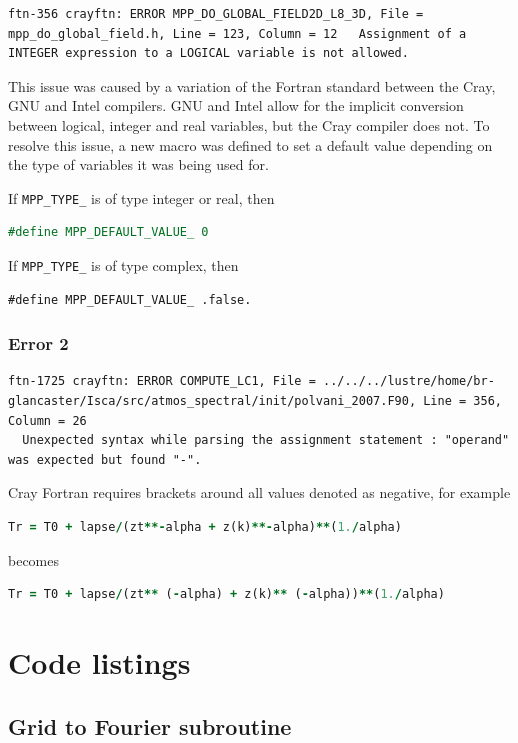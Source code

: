 \documentclass[a4paper,11pt]{report}
\newcommand{\toclesssection}[1]{\section{#1}\addtocounter{section}{1}}
\begin{document}
\begin{lstlisting}
ftn-356 crayftn: ERROR MPP_DO_GLOBAL_FIELD2D_L8_3D, File = mpp_do_global_field.h, Line = 123, Column = 12   Assignment of a INTEGER expression to a LOGICAL variable is not allowed.
\end{lstlisting}
This issue was caused by a variation of the Fortran standard between the Cray, GNU and Intel compilers. GNU and Intel allow for the implicit conversion between logical, integer and real variables, but the Cray compiler does not. To resolve this issue, a new macro was defined to set a default value depending on the type of variables it was being used for. 
\par
If \texttt{MPP\_TYPE\_} is of type integer or real, then 
\begin{lstlisting}[language=Fortran]
#define MPP_DEFAULT_VALUE_ 0
\end{lstlisting}
\par
If \texttt{MPP\_TYPE\_} is of type complex, then 
\begin{lstlisting}
#define MPP_DEFAULT_VALUE_ .false.
\end{lstlisting}

\subsection{Error 2}

\begin{lstlisting}
ftn-1725 crayftn: ERROR COMPUTE_LC1, File = ../../../lustre/home/br-glancaster/Isca/src/atmos_spectral/init/polvani_2007.F90, Line = 356, Column = 26 
  Unexpected syntax while parsing the assignment statement : "operand" was expected but found "-".
\end{lstlisting}
Cray Fortran requires brackets around all values denoted as negative, for example
\begin{lstlisting}[language=Fortran]
Tr = T0 + lapse/(zt**-alpha + z(k)**-alpha)**(1./alpha)
\end{lstlisting}
becomes 
\begin{lstlisting}[language=Fortran]
Tr = T0 + lapse/(zt** (-alpha) + z(k)** (-alpha))**(1./alpha)
\end{lstlisting}




\chapter{Code listings}

\toclesssection{Grid to Fourier subroutine}
\end{document}
